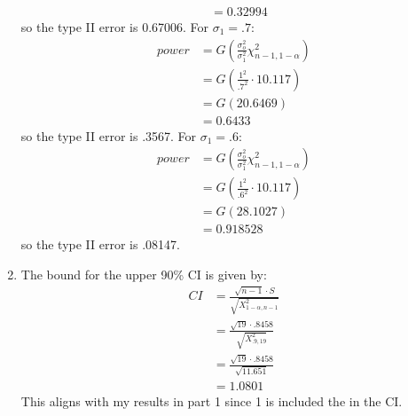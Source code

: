 \documentclass{article}
\begin{document}
\begin{enumerate}
\begin{align*}
&= 0.32994
\end{align*}
so the type II error is 0.67006. For $\sigma_1 = .7$: \\
\begin{align*}
power &= G(\frac{\sigma_o^2}{\sigma_1^2}\chi^2_{n - 1, 1 - \alpha}) \\
&= G(\frac{1^2}{.7^2}\cdot 10.117) \\
&= G(20.6469) \\
&= 0.6433
\end{align*}
so the type II error is .3567. For $\sigma_1 = .6$: \\
\begin{align*}
power &= G(\frac{\sigma_o^2}{\sigma_1^2}\chi^2_{n - 1, 1 - \alpha}) \\
&= G(\frac{1^2}{.6^2}\cdot 10.117) \\
&= G(28.1027) \\
&= 0.918528
\end{align*}
so the type II error is .08147. \\
\item The bound for the upper 90\% CI is given by: \\
\begin{align*}
CI &= \frac{\sqrt{n - 1} \cdot S}{\sqrt{X^2_{1 - \alpha, n - 1}}} \\
&= \frac{\sqrt{19} \cdot .8458}{\sqrt{X^2_{.9, 19}}} \\
&= \frac{\sqrt{19} \cdot .8458}{\sqrt{11.651}} \\
&= 1.0801
\end{align*}
This aligns with my results in part 1 since 1 is included the in the CI. 
\end{enumerate}
\end{document}
